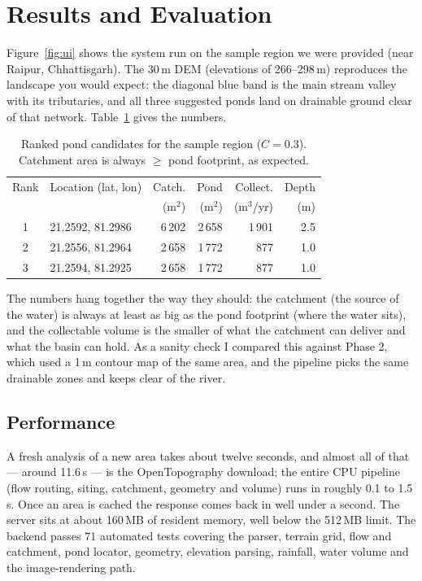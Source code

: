 \documentclass[manuscript,screen]{acmart}
\begin{document}
\section{Results and Evaluation}
\label{sec:results}
Figure~\ref{fig:ui} shows the system run on the sample region we were provided (near
Raipur, Chhattisgarh). The 30\,m DEM (elevations of 266--298\,m) reproduces the
landscape you would expect: the diagonal blue band is the main stream valley with
its tributaries, and all three suggested ponds land on drainable ground clear of
that network. Table~\ref{tab:results} gives the numbers.

\begin{table}[h]
  \caption{Ranked pond candidates for the sample region ($C=0.3$).
  Catchment area is always $\geq$ pond footprint, as expected.}
  \label{tab:results}
  \small
  \begin{tabular}{clrrrr}
    \toprule
    Rank & Location (lat, lon) & Catch. & Pond & Collect. & Depth \\
         &                     & (m$^2$)& (m$^2$)& (m$^3$/yr) & (m) \\
    \midrule
    1 & 21.2592, 81.2986 & 6\,202 & 2\,658 & 1\,901 & 2.5 \\
    2 & 21.2556, 81.2964 & 2\,658 & 1\,772 & 877   & 1.0 \\
    3 & 21.2594, 81.2925 & 2\,658 & 1\,772 & 877   & 1.0 \\
    \bottomrule
  \end{tabular}
\end{table}

The numbers hang together the way they should: the catchment (the source of the
water) is always at least as big as the pond footprint (where the water sits), and
the collectable volume is the smaller of what the catchment can deliver and what
the basin can hold. As a sanity check I compared this against Phase 2, which used a
1\,m contour map of the same area, and the pipeline picks the same drainable zones
and keeps clear of the river.

\subsection{Performance}
A fresh analysis of a new area takes about twelve seconds, and almost all of that
--- around 11.6\,s --- is the OpenTopography download; the entire CPU pipeline (flow
routing, siting, catchment, geometry and volume) runs in roughly 0.1 to 1.5\,s. Once
an area is cached the response comes back in well under a second. The server sits at
about 160\,MB of resident memory, well below the 512\,MB limit. The backend passes
71 automated tests covering the parser, terrain grid, flow and catchment, pond
locator, geometry, elevation parsing, rainfall, water volume and the image-rendering
path.
\end{document}
